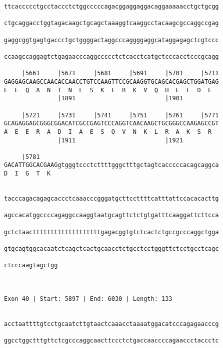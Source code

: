 \documentclass{article}
\begin{document}
\begin{Verbatim}
ttcaccccctgcctaccctctggcccccagacggaggaggacaggaaaaacctgctgcgg
                                                            
ctgcaggacctggtagacaagctgcagctaaaggtcaaggcctacaagcgccaggccgag
                                                            
gaggcggtgagtgaccctgctggggactaggcccaggggaggcataggagagctcgtccc
                                                            
ccaagccaggagtctgagaacccaggccccctctcacctcatgctcccacctcccgcagg
                                                            
     |5661     |5671     |5681     |5691     |5701     |5711
GAGGAGCAAGCCAACACCAACCTGTCCAAGTTCCGCAAGGTGCAGCACGAGCTGGATGAG
E  E  Q  A  N  T  N  L  S  K  F  R  K  V  Q  H  E  L  D  E  
               |1891                         |1901          
  
     |5721     |5731     |5741     |5751     |5761     |5771
GCAGAGGAGCGGGCGGACATCGCCGAGTCCCAGGTCAACAAGCTGCGGGCCAAGAGCCGT
A  E  E  R  A  D  I  A  E  S  Q  V  N  K  L  R  A  K  S  R  
               |1911                         |1921          
  
     |5781                                                  
GACATTGGCACGAAGgtgggtccctcttttgggctttgctagtcacccccacagcaggca
D  I  G  T  K                                               
                                                            
  
tacccagacagagcaccctcaaacccgggatgcttccttttcatttattccacacacttg
                                                            
agccacatggccccagaggccaaggtaatgcagttctctgtgatttcaaggattcttcca
                                                            
gctctaactttttttttttttttttttgagacggtgtctcactctgccgcccaggctgga
                                                            
gtgcagtggcacaatctcagctcactgcaacctctgcctcctgggttctcctgcctcagc
                                                            
ctcccaagtagctgg
               
               
 
Exon 40 | Start: 5897 | End: 6030 | Length: 133


acctaattttgtcctgcaatcttgtaactcaaacctaaaatggacatcccagagaacccg
                                                            
ggcctggctttgttctcgcccaggcaacttccctctgaccaaccccagaaccctaccctc
                                                            

\end{Verbatim}
\end{document}
